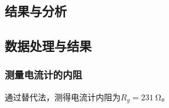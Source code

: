 \documentclass[]{../template/Report}
\begin{document}
\begin{fullreportonly}

\section{结果与分析}
\subsection{数据处理与结果}
\subsubsection{测量电流计的内阻}
通过替代法，测得电流计内阻为$R_g = \SI{231}{\ohm}$。

\end{fullreportonly}
\end{document}
